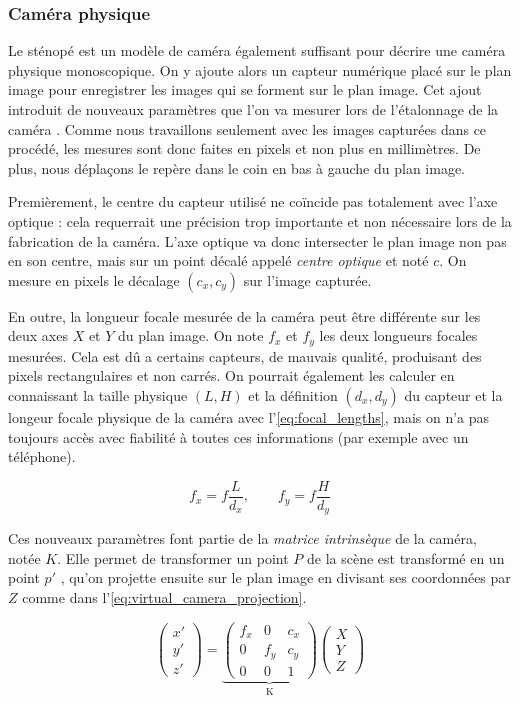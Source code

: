 \subsubsection{Caméra physique}
Le sténopé est un modèle de caméra également suffisant pour décrire une caméra physique monoscopique. On y ajoute alors un capteur numérique placé sur le plan image pour enregistrer les images qui se forment sur le plan image. Cet ajout introduit de nouveaux paramètres que l'on va mesurer lors de l'étalonnage de la caméra . Comme nous travaillons seulement avec les images capturées dans ce procédé, les mesures sont donc faites en pixels et non plus en millimètres. De plus, nous déplaçons le repère dans le coin en bas à gauche du plan image.

Premièrement, le centre du capteur utilisé ne coïncide pas totalement avec l'axe optique : cela requerrait une précision trop importante et non nécessaire lors de la fabrication de la caméra. L'axe optique va donc intersecter le plan image non pas en son centre, mais sur un point décalé appelé \emph{centre optique} et noté $c$. On mesure en pixels le décalage $(c_x,c_y)$ sur l'image capturée.

En outre, la longueur focale mesurée de la caméra peut être différente sur les deux axes $X$ et $Y$ du plan image. On note $f_x$ et $f_y$ les deux longueurs focales mesurées. Cela est dû a certains capteurs, de mauvais qualité, produisant des pixels rectangulaires et non carrés. On pourrait également les calculer en connaissant la taille physique $(L,H)$ et la définition $(d_x,d_y)$ du capteur et la longeur focale physique de la caméra avec l'\autoref{eq:focal_lengths}, mais on n'a pas toujours accès avec fiabilité à toutes ces informations (par exemple avec un téléphone).

\begin{equation}
  \label{eq:focal_lengths}
  f_x = f \frac{L}{d_x},\qquad f_y = f \frac{H}{d_y}
\end{equation}

Ces nouveaux paramètres font partie de la \emph{matrice intrinsèque} de la caméra, notée $K$. Elle permet de transformer un point $P$ de la scène est transformé en un point $p'$ , qu'on projette ensuite sur le plan image en divisant ses coordonnées par $Z$ comme dans l'\autoref{eq:virtual_camera_projection}.

\begin{equation}
  \label{eq:projection}
  \begin{pmatrix}
    x'\\
    y'\\
    z'
  \end{pmatrix}
  =
  \underbrace{
    \begin{pmatrix}
      f_x & 0 & c_x\\
      0 & f_y & c_y\\
      0 & 0 & 1
    \end{pmatrix}
  }_\text{K}
  \begin{pmatrix}
    X\\
    Y\\
    Z
  \end{pmatrix}
\end{equation}

